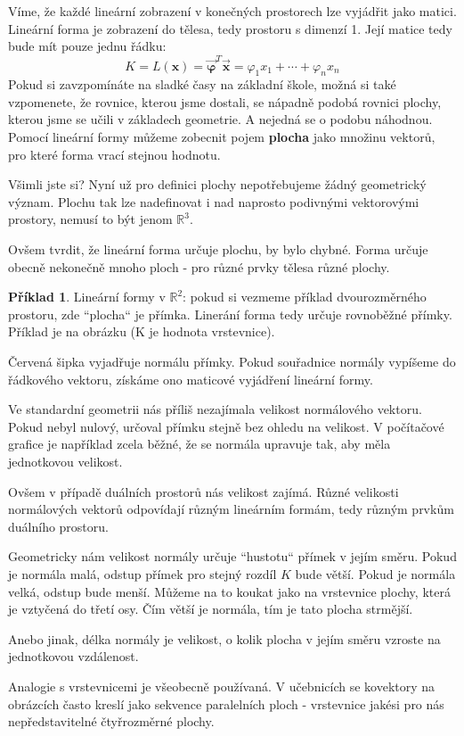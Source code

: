 \documentclass[a5paper,12pt]{amsbook}
\theoremstyle{definition}
\newtheorem{example}{Příklad}[chapter]
\newcommand{\myscalar}[1]{#1}
\newcommand{\myvec}[1]{\mathbf{#1}}
\newcommand{\mycoord}[1]{\overrightarrow{\mathbf{#1}}}
\newcommand{\mymap}[1]{#1}
\begin{document}
Víme, že každé lineární zobrazení v konečných prostorech lze vyjádřit jako matici. Lineární forma
je zobrazení do tělesa, tedy prostoru s dimenzí 1. Její matice tedy bude mít pouze jednu řádku:
\begin{equation*}
\myscalar{K}=\mymap{L}(\myvec{x}) = \mycoord{\varphi}^T\mycoord{x} = \myscalar{\varphi_1}\myscalar{x_1} + \cdots + \myscalar{\varphi_n}\myscalar{x_n}
\end{equation*}
Pokud si zavzpomínáte na sladké časy na základní škole, možná si také vzpomenete, že rovnice, kterou
jsme dostali, se nápadně podobá rovnici plochy, kterou jsme se učili v základech geometrie. A nejedná
se o podobu náhodnou. Pomocí lineární formy můžeme zobecnit pojem \textbf{plocha} jako množinu vektorů,
pro které forma vrací stejnou hodnotu.

Všimli jste si? Nyní už pro definici plochy nepotřebujeme žádný geometrický význam. Plochu tak
lze nadefinovat i nad naprosto podivnými vektorovými prostory, nemusí to být jenom $\mathbb{R}^3$.

Ovšem tvrdit, že lineární forma určuje plochu, by bylo chybné. Forma určuje obecně nekonečně mnoho
ploch - pro různé prvky tělesa různé plochy.

\begin{example}\label{example:linforma1}Lineární formy v $\mathbb{R}^2$: pokud si vezmeme příklad
dvourozměrného prostoru, zde ``plocha`` je přímka. Linerání forma tedy určuje rovnoběžné přímky.
Příklad je na obrázku (K je hodnota vrstevnice).

\begin{center}

\end{center}

\noindent Červená šipka vyjadřuje normálu přímky. Pokud souřadnice normály vypíšeme do řádkového
vektoru, získáme ono maticové vyjádření lineární formy.

Ve standardní geometrii nás příliš nezajímala velikost normálového vektoru. Pokud nebyl nulový, určoval
přímku stejně bez ohledu na velikost. V počítačové grafice je například zcela běžné, že se normála
upravuje tak, aby měla jednotkovou velikost.

Ovšem v případě duálních prostorů nás velikost zajímá. Různé velikosti normálových vektorů odpovídají
různým lineárním formám, tedy různým prvkům duálního prostoru.

Geometricky nám velikost normály určuje ``hustotu`` přímek v jejím směru. Pokud je normála malá,
odstup přímek pro stejný rozdíl $K$ bude větší. Pokud je normála velká, odstup bude menší. Můžeme
na to koukat jako na vrstevnice plochy, která je vztyčená do třetí osy. Čím větší je normála, tím
je tato plocha strmější.

Anebo jinak, délka normály je velikost, o kolik plocha v jejím směru vzroste na jednotkovou
vzdálenost.

Analogie s vrstevnicemi je všeobecně používaná. V učebnicích se kovektory na obrázcích často kreslí
jako sekvence paralelních ploch - vrstevnice jakési pro nás nepředstavitelné čtyřrozměrné plochy.

\end{example}
\end{document}
